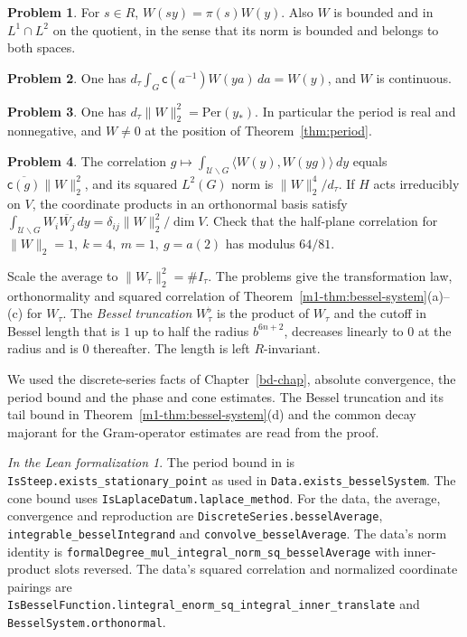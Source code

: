\documentclass[reqno]{amsart}
\newcounter{chap}
\theoremstyle{definition}
\newtheorem{problem}{Problem}[section]
\theoremstyle{plain}
\theoremstyle{remark}
\newtheorem*{leanremark}{In the Lean formalization}
\newcommand{\Uc}{\mathcal U}
\newcommand{\cf}{\mathsf c}
\newcommand{\Per}{\mathrm{Per}}
\newcommand{\tl}[1]{\texttt{#1}}
\begin{document}
\begin{problem}\label{pr:equivariance}
For \(s\in R\), \(W(sy)=\pi(s)W(y)\).  Also \(W\) is bounded and in \(L^1\cap L^2\) on the quotient, in the sense that its norm is bounded and belongs to both spaces.
\end{problem}

\begin{problem}\label{pr:reproduce}
One has \(d_\tau\int_G\cf(a^{-1})W(ya)\,da=W(y)\), and \(W\) is continuous.
\end{problem}

\begin{problem}\label{pr:norm-identity}
One has \(d_\tau\|W\|_2^2=\Per(y_*)\).  In particular the period is real and nonnegative, and \(W\ne0\) at the position of Theorem~\ref{thm:period}.
\end{problem}

\begin{problem}\label{pr:coefficient}
The correlation \(g\mapsto\int_{\Uc\backslash G}\langle W(y),W(yg)\rangle\,dy\) equals \(\overline{\cf(g)}\|W\|_2^2\), and its squared \(L^2(G)\) norm is \(\|W\|_2^4/d_\tau\).  If \(H\) acts irreducibly on \(V\), the coordinate products in an orthonormal basis satisfy \(\int_{\Uc\backslash G}W_i\overline{W_j}\,dy=\delta_{ij}\|W\|_2^2/\dim V\).  Check that the half-plane correlation for \(\|W\|_2=1,\ k=4,\ m=1,\ g=a(2)\) has modulus \(64/81\).
\end{problem}

Scale the average to \(\|W_\tau\|_2^2=\#I_\tau\).  The problems give the transformation law, orthonormality and squared correlation of Theorem~\ref{m1-thm:bessel-system}(a)--(c) for \(W_\tau\).  The \emph{Bessel truncation} \(W_\tau^\flat\) is the product of \(W_\tau\) and the cutoff in Bessel length that is \(1\) up to half the radius \(b^{6n+2}\), decreases linearly to \(0\) at the radius and is \(0\) thereafter.  The length is left \(R\)-invariant.

We used the discrete-series facts of Chapter~\ref{bd-chap}, absolute convergence, the period bound and the phase and cone estimates.  The Bessel truncation and its tail bound in Theorem~\ref{m1-thm:bessel-system}(d) and the common decay majorant for the Gram-operator estimates are read from the proof.

\begin{leanremark}
\raggedright The period bound in \cite{GL} is \tl{IsSteep.exists\_stationary\_point}
as used in \tl{Data.exists\_besselSystem}.  The cone bound uses \tl{IsLaplaceDatum.laplace\_method}.
For the data, the average, convergence and reproduction are \tl{DiscreteSeries.besselAverage},
\tl{integrable\_besselIntegrand} and \tl{convolve\_besselAverage}.
The data's norm identity is \tl{formalDegree\_mul\_integral\_norm\_sq\_besselAverage}
with inner-product slots reversed.  The data's squared correlation and normalized coordinate
pairings are \tl{IsBesselFunction.lintegral\_enorm\_sq\_integral\_inner\_translate}
and \tl{BesselSystem.orthonormal}.
\end{leanremark}
\end{document}
